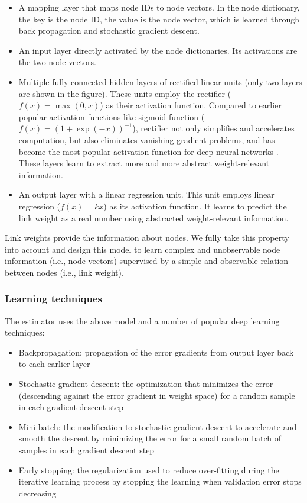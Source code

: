 \documentclass{article}
\begin{document}
\begin{itemize}
	\item A mapping layer that maps node IDs to node vectors.
	In the node dictionary,	the key is the node ID, the value is the node vector,
	which is learned through back propagation and stochastic gradient descent.
	\item An input layer directly activated by the node dictionaries.
	Its activations are the two node vectors.
	\item Multiple fully connected hidden layers of rectified linear units
	(only two layers are shown in the figure).
	These units employ the rectifier ($ f(x) = \max (0, x) $)
	as their activation function.
	Compared to earlier popular activation functions like sigmoid function
	($ f(x) = (1 + \exp(-x))^{-1} $),
	rectifier not only simplifies and accelerates computation,
	but also eliminates vanishing gradient problems,
	and has become the most popular activation function
	for deep neural networks \cite{lecun2015deep}.
	These layers learn to extract more and more abstract weight-relevant 
	information.
	\item An output layer with a linear regression unit.
	This unit employs linear regression ($ f(x) = kx $) as its activation function.
	It learns to predict the link weight as a real number
	using abstracted weight-relevant information.
\end{itemize}
Link weights provide the information about nodes.
We fully take this property into account and design this model to learn 
complex and unobservable node information (i.e., node vectors) 
supervised by a simple and observable relation between nodes (i.e., link weight).

\subsubsection{Learning techniques}
The estimator uses the above model and a number of popular deep learning 
techniques:
\begin{itemize}
	\item Backpropagation: propagation of the error gradients from output layer 
	back to each earlier layer \cite{rumelhart1988learning}
	\item Stochastic gradient descent: the optimization that minimizes 
	the error (descending against the error gradient in weight space) for a 
	random sample in each gradient descent step \cite{lecun2012efficient}
	\item Mini-batch: the modification to stochastic gradient descent to 
	accelerate and smooth the descent by minimizing the error for a small 
	random batch of samples in each gradient descent step \cite{mairal2010online}
	\item Early stopping: the regularization used to reduce over-fitting during the iterative learning process by stopping the learning when validation error stops decreasing \cite{smale2007learning}
\end{itemize}
\end{document}
